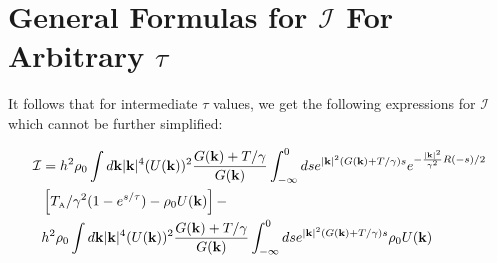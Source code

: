 \documentclass[superscriptaddress, twocolumn, prl, longbibliography, nofootinbib]{revtex4-1}
\newcommand{\A}{\text{\tiny{A}}}
\begin{document}
\section{General Formulas for $\mathcal{I}$ For Arbitrary $\tau$}

It follows that for intermediate $\tau$ values, we get the following expressions for $\mathcal{I}$ which cannot be further simplified:

\begin{widetext}
\begin{align}\label{eq:final_expression_I}
\mathcal{I} & =  h^2 \rho_0 \int d{\bf k} |{\bf k}|^4 (U({\bf k}))^2 \dfrac{ G({\bf k}) + T/ \gamma}{G({\bf k})} \int_{-\infty}^0 ds e^{|{\bf k}|^2 ( G({\bf k}) + T/ \gamma)s}  e^{-\frac{|{\bf k}|^2}{\gamma^2} R(-s)/2}
\\
& \left[ T_\A/\gamma^2  (1-e^{s/\tau}) - \rho_0 U({\bf k}) \right] -
\\
&h^2 \rho_0 \int d{\bf k} |{\bf k}|^4 (U({\bf k}))^2 \dfrac{ G({\bf k}) + T/ \gamma}{G({\bf k})}
\int_{-\infty}^0 ds e^{|{\bf k}|^2 ( G({\bf k}) + T/ \gamma)s} \rho_0 U({\bf k})
\end{align}
\end{widetext}









\end{document}
